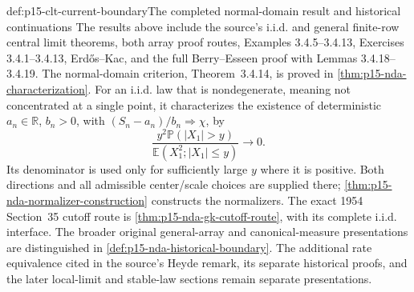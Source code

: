 \begin{proofboundary}{def:p15-clt-current-boundary}{The completed normal-domain result and historical continuations}
The results above include the source's i.i.d. and general finite-row
central limit theorems, both array proof routes, Examples 3.4.5--3.4.13,
Exercises 3.4.1--3.4.13, Erd\H{o}s--Kac, and the full
Berry--Esseen proof with Lemmas 3.4.18--3.4.19.
The normal-domain criterion, Theorem~3.4.14, is proved in
\cref{thm:p15-nda-characterization}. For an i.i.d. law that is nondegenerate,
meaning not concentrated at a single point, it
characterizes the existence of deterministic \(a_n\in\mathbb R\),
\(b_n>0\), with \((S_n-a_n)/b_n\Rightarrow\chi\), by
\[
 \frac{y^2\mathbb P(|X_1|>y)}
      {\mathbb E(X_1^2;|X_1|\leq y)}\longrightarrow0.
 \]
Its denominator is used only for sufficiently large \(y\) where
it is positive. Both directions and all admissible center/scale
choices are supplied there; \cref{thm:p15-nda-normalizer-construction}
constructs the normalizers. The exact 1954 Section~35 cutoff route is
\cref{thm:p15-nda-gk-cutoff-route}, with its complete i.i.d. interface.
The broader original general-array and canonical-measure presentations
are distinguished in \cref{def:p15-nda-historical-boundary}.
The additional rate equivalence cited in the source's
Heyde remark, its separate historical proofs, and the later
local-limit and stable-law sections remain separate presentations.
\end{proofboundary}
